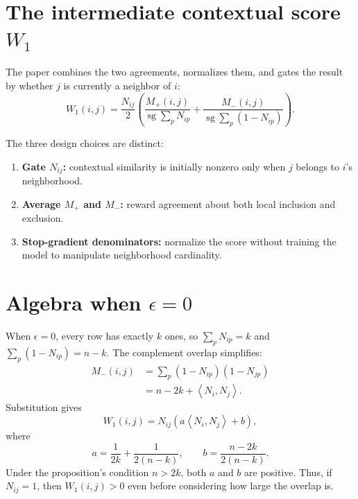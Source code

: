 \documentclass[11pt,oneside,openany]{book}
\theoremstyle{myplain}
\theoremstyle{definition}
\newcommand{\sg}{\operatorname{sg}}
\newcommand{\inner}[2]{\left\langle #1,#2\right\rangle}
\newcommand{\paperEq}[1]{\tag{P#1}}
\begin{document}
\section{The intermediate contextual score $W_1$}

The paper combines the two agreements, normalizes them, and gates the result by whether $j$ is currently a neighbor of $i$:
\begin{equation*}
\boxed{
W_1(i,j)=\frac{N_{ij}}{2}
\left(
\frac{M_+(i,j)}{\sg\sum_p N_{ip}}
+
\frac{M_-(i,j)}{\sg\sum_p(1-N_{ip})}
\right).}
\paperEq{3}
\label{eq:w1}
\end{equation*}

The three design choices are distinct:
\begin{enumerate}[leftmargin=*,itemsep=3pt]
  \item \textbf{Gate $N_{ij}$:} contextual similarity is initially nonzero only when $j$ belongs to $i$'s neighborhood.
  \item \textbf{Average $M_+$ and $M_-$:} reward agreement about both local inclusion and exclusion.
  \item \textbf{Stop-gradient denominators:} normalize the score without training the model to manipulate neighborhood cardinality.
\end{enumerate}

\section{Algebra when $\epsilon=0$}

When $\epsilon=0$, every row has exactly $k$ ones, so $\sum_pN_{ip}=k$ and $\sum_p(1-N_{ip})=n-k$. The complement overlap simplifies:
\begin{align*}
M_-(i,j)
&=\sum_p(1-N_{ip})(1-N_{jp})\\
&=n-2k+\inner{N_i}{N_j}.
\paperEq{12}
\label{eq:mminus-simplify}
\end{align*}
Substitution gives
\begin{equation*}
W_1(i,j)=N_{ij}\left(a\inner{N_i}{N_j}+b\right),
\paperEq{14}
\label{eq:w1-simplified}
\end{equation*}
where
\begin{equation}
  a=\frac{1}{2k}+\frac{1}{2(n-k)},\qquad
  b=\frac{n-2k}{2(n-k)}.
  \label{eq:ab}
\end{equation}
Under the proposition's condition $n>2k$, both $a$ and $b$ are positive. Thus, if $N_{ij}=1$, then $W_1(i,j)>0$ even before considering how large the overlap is.
\end{document}
